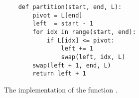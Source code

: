 \vspace*{-1.6cm}
\begin{figure}[!ht]
  \centering
\begin{verbatim}
    def partition(start, end, L):
        pivot = L[end]
        left  = start - 1
        for idx in range(start, end):
            if L[idx] <= pivot:
                left += 1
                swap(left, idx, L)
        swap(left + 1, end, L)
        return left + 1
\end{verbatim}
\vspace*{-0.7cm}
  \caption{The implementation of the function .}
  \label{fig:quick-sort-array.stlx-partition}
\end{figure}
\FloatBarrier


